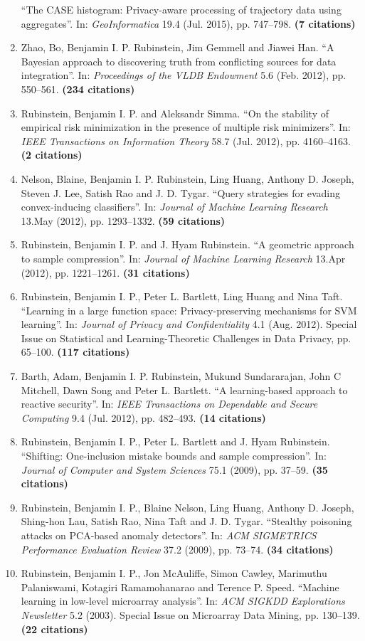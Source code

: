 \documentclass[a4paper,12pt]{article}
\begin{document}
\begin{enumerate}
``The CASE histogram: Privacy-aware processing of trajectory data using aggregates''.
In: \emph{GeoInformatica} 19.4 (Jul. 2015), pp. 747--798.
 \textbf{(7 citations)}
\item Zhao, Bo, Benjamin I. P. Rubinstein, Jim Gemmell and Jiawei Han.
``A Bayesian approach to discovering truth from conflicting sources for data integration''.
In: \emph{Proceedings of the VLDB Endowment} 5.6 (Feb. 2012), pp. 550--561.
 \textbf{(234 citations)}
\item Rubinstein, Benjamin I. P. and Aleksandr Simma.
``On the stability of empirical risk minimization in the presence of multiple risk minimizers''.
In: \emph{IEEE Transactions on Information Theory} 58.7 (Jul. 2012), pp. 4160--4163.
 \textbf{(2 citations)}
\item Nelson, Blaine, Benjamin I. P. Rubinstein, Ling Huang, Anthony D. Joseph, Steven J. Lee, Satish Rao and J. D. Tygar.
``Query strategies for evading convex-inducing classifiers''.
In: \emph{Journal of Machine Learning Research} 13.May (2012), pp. 1293--1332.
 \textbf{(59 citations)}
\item Rubinstein, Benjamin I. P. and J. Hyam Rubinstein.
``A geometric approach to sample compression''.
In: \emph{Journal of Machine Learning Research} 13.Apr (2012), pp. 1221--1261.
 \textbf{(31 citations)}
\item Rubinstein, Benjamin I. P., Peter L. Bartlett, Ling Huang and Nina Taft.
``Learning in a large function space: Privacy-preserving mechanisms for SVM learning''.
In: \emph{Journal of Privacy and Confidentiality} 4.1 (Aug. 2012). Special Issue on Statistical and Learning-Theoretic Challenges in Data Privacy, pp. 65--100.
 \textbf{(117 citations)}
\item Barth, Adam, Benjamin I. P. Rubinstein, Mukund Sundararajan, John C Mitchell, Dawn Song and Peter L. Bartlett.
``A learning-based approach to reactive security''.
In: \emph{IEEE Transactions on Dependable and Secure Computing} 9.4 (Jul. 2012), pp. 482--493.
 \textbf{(14 citations)}
\item Rubinstein, Benjamin I. P., Peter L. Bartlett and J. Hyam Rubinstein.
``Shifting: One-inclusion mistake bounds and sample compression''.
In: \emph{Journal of Computer and System Sciences} 75.1 (2009), pp. 37--59.
 \textbf{(35 citations)}
\item Rubinstein, Benjamin I. P., Blaine Nelson, Ling Huang, Anthony D. Joseph, Shing-hon Lau, Satish Rao, Nina Taft and J. D. Tygar.
``Stealthy poisoning attacks on PCA-based anomaly detectors''.
In: \emph{ACM SIGMETRICS Performance Evaluation Review} 37.2 (2009), pp. 73--74.
 \textbf{(34 citations)}
\item Rubinstein, Benjamin I. P., Jon McAuliffe, Simon Cawley, Marimuthu Palaniswami, Kotagiri Ramamohanarao and Terence P. Speed.
``Machine learning in low-level microarray analysis''.
In: \emph{ACM SIGKDD Explorations Newsletter} 5.2 (2003). Special Issue on Microarray Data Mining, pp. 130--139.
 \textbf{(22 citations)}

\setcounter{list}{\value{enumi}}
\end{enumerate}
\end{document}
